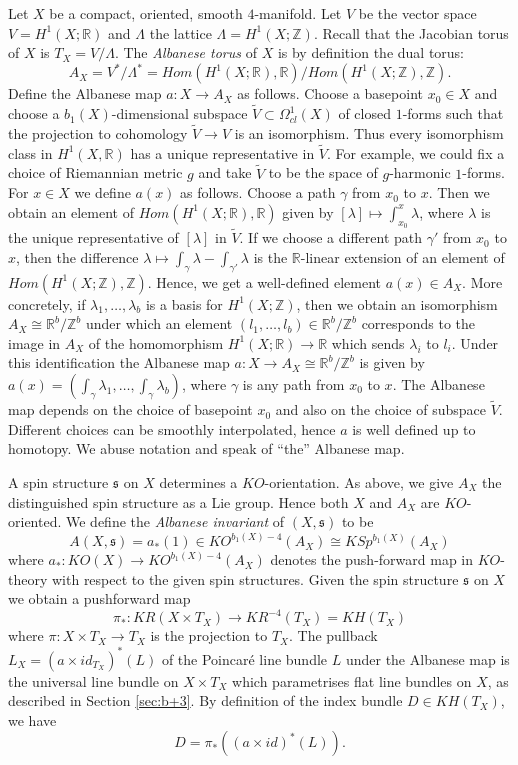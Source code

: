 \documentclass{amsart}
\theoremstyle{definition}
\theoremstyle{remark}
\numberwithin{equation}{section}
\begin{document}
Let $X$ be a compact, oriented, smooth $4$-manifold. Let $V$ be the vector space $V = H^1(X ; \mathbb{R})$ and $\Lambda$ the lattice $\Lambda = H^1(X ; \mathbb{Z})$. Recall that the Jacobian torus of $X$ is $T_X = V/\Lambda$. The {\em Albanese torus} of $X$ is by definition the dual torus:
\[
A_X = V^*/\Lambda^* = Hom( H^1(X ; \mathbb{R}) , \mathbb{R})/ Hom( H^1(X ; \mathbb{Z}) , \mathbb{Z} ).
\]
Define the Albanese map $a : X \to A_X$ as follows. Choose a basepoint $x_0 \in X$ and choose a $b_1(X)$-dimensional subspace $\widetilde{V} \subset \Omega^1_{cl}(X)$ of closed $1$-forms such that the projection to cohomology $\widetilde{V} \to V$ is an isomorphism. Thus every isomorphism class in $H^1(X , \mathbb{R})$ has a unique representative in $\widetilde{V}$. For example, we could fix a choice of Riemannian metric $g$ and take $\widetilde{V}$ to be the space of $g$-harmonic $1$-forms. For $x \in X$ we define $a(x)$ as follows. Choose a path $\gamma$ from $x_0$ to $x$. Then we obtain an element of $Hom( H^1(X ; \mathbb{R}) , \mathbb{R})$ given by $[\lambda] \mapsto \int_{x_0}^{x} \lambda$, where $\lambda$ is the unique representative of $[\lambda]$ in $\widetilde{V}$. If we choose a different path $\gamma'$ from $x_0$ to $x$, then the difference $\lambda \mapsto \int_{\gamma} \lambda - \int_{\gamma'} \lambda$ is the $\mathbb{R}$-linear extension of an element of $Hom( H^1(X ; \mathbb{Z}) , \mathbb{Z})$. Hence, we get a well-defined element $a(x) \in A_X$. More concretely, if $\lambda_1, \dots , \lambda_b$ is a basis for $H^1(X ; \mathbb{Z})$, then we obtain an isomorphism $A_X \cong \mathbb{R}^b/\mathbb{Z}^b$ under which an element $(l_1 , \dots , l_b) \in \mathbb{R}^b/\mathbb{Z}^b$ corresponds to the image in $A_X$ of the homomorphism $H^1(X ; \mathbb{R}) \to \mathbb{R}$ which sends $\lambda_i$ to $l_i$. Under this identification the Albanese map $a : X \to A_X \cong \mathbb{R}^b/\mathbb{Z}^b$ is given by $a(x) = ( \int_{\gamma} \lambda_1 , \dots , \int_{\gamma} \lambda_b)$, where $\gamma$ is any path from $x_0$ to $x$. The Albanese map depends on the choice of basepoint $x_0$ and also on the choice of subspace $\widetilde{V}$. Different choices can be smoothly interpolated, hence $a$ is well defined up to homotopy. We abuse notation and speak of ``the'' Albanese map.

A spin structure $\mathfrak{s}$ on $X$ determines a $KO$-orientation. As above, we give $A_X$ the distinguished spin structure as a Lie group. Hence both $X$ and $A_X$ are $KO$-oriented. We define the {\em Albanese invariant} of $(X , \mathfrak{s})$ to be
\[
A(X,\mathfrak{s}) = a_*(1) \in KO^{b_1(X) - 4}(A_X) \cong KSp^{b_1(X)}(A_X)
\]
where $a_* : KO(X) \to KO^{b_1(X)-4}(A_X)$ denotes the push-forward map in $KO$-theory with respect to the given spin structures. Given the spin structure $\mathfrak{s}$ on $X$ we obtain a pushforward map 
\[
\pi_* : KR(X \times T_X) \to KR^{-4}(T_X) = KH(T_X)
\]
where $\pi : X \times T_X \to T_X$ is the projection to $T_X$. The pullback $L_X = (a \times id_{T_X})^*(L)$ of the Poincar\'e line bundle $L$ under the Albanese map is the universal line bundle on $X \times T_X$ which parametrises flat line bundles on $X$, as described in Section \ref{sec:b+3}. By definition of the index bundle $D \in KH(T_X)$, we have
\[
D = \pi_*( (a \times id)^*(L) ).
\]
\end{document}
